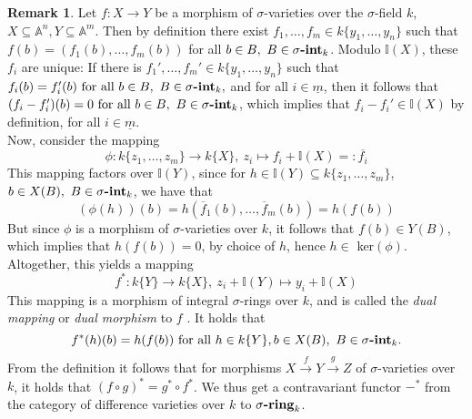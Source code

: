 \documentclass{article}
\def\I{\mathbb{I}}
\def\s{\sigma}
\def\fa{\text{ for all }}
\newcommand{\catname}[1]{{\normalfont\textbf{#1}}}
\newcommand{\sintk}{\s\text{\catname{-int}}_k}
\newcommand{\sringk}{\s\text{\catname{-ring}}_k}
\theoremstyle{plain}
\theoremstyle{definition}
\newtheorem{rem}[Satz]{Remark}
\begin{document}
\begin{rem}\label{dualmor}
Let $f: X \rightarrow Y$ be a morphism of $\s$-varieties over the $\s$-field $k$, $X \subseteq \mathbb{A}^n, Y \subseteq \mathbb{A}^m$. Then by definition there exist $f_1, \ldots, f_m \in k\{y_1,\ldots,y_n\}$ such 
that $f(b) = (f_1(b),\ldots,f_m(b))$ for all $b \in B, ~ B \in \sintk$. Modulo $\I(X)$, these $f_i$ are unique:
 If there is $f_1', \ldots, f_m' \in k\{y_1,\ldots,y_n\}$ such that $f_i(b) = f'_i(b) \fa b \in B, ~ B \in \sintk,$ and for all $i \in \underline{m}$,
then it follows that $(f_i - f_i')(b) = 0 \fa b \in B, ~ B \in \sintk$, which implies that $f_i - f_i' \in \I(X)$ by definition, for all $i \in \underline{m}$. \\
\indent Now, consider the mapping \[ \phi: k\{z_1,\ldots,z_m \} \rightarrow k\{X\}, ~ z_i \mapsto f_i + \I(X) =: \overline{f_i} \]
This mapping factors over $\I(Y)$, since for $h \in \I(Y) \subseteq k\{z_1,\ldots,z_m\}$, $b \in X(B), ~ B \in \sintk$, we have that 
\[ (\phi(h))(b) = h(\overline f_1(b), \ldots, \overline f_m(b)) = h(f(b)) \]
But since $\phi$ is a morphism of $\s$-varieties over $k$, it follows that $f(b) \in Y(B)$, which implies that $h(f(b)) = 0$, by choice of $h$, hence $h \in $ ker$(\phi)$.
Altogether, this yields a mapping 
\[ f^* : k\{Y\} \rightarrow k\{X\}, ~ z_i + \I(Y) \mapsto y_i + \I(X) \]
This mapping is a morphism of integral $\s$-rings over $k$, and is called the \emph{dual mapping} or \emph{dual morphism} to $f$ . It holds that
\[ f^*(h)(b) = h(f(b)) \fa h \in k\{Y\}, b \in X(B), ~ B \in \sintk. \]
From the definition it follows that for morphisms $X \xrightarrow{f} Y \xrightarrow{g} Z$ of $\s$-varieties over $k$, it holds that $ (f \circ g)^* = g^* \circ f^*$. 
We thus get a contravariant functor $-^*$ from the category of difference varieties over $k$ to $\sringk$.
\end{rem}
\end{document}
